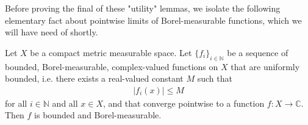 Before proving the final of these "utility" lemmas, we isolate the following elementary fact about pointwise limits of Borel-measurable functions, which we will have need of shortly.

\begin{lemma}
    \label{lmm:pointwise-limits-of-borel-measurable-functions}
    \leanok
    Let $X$ be a compact metric measurable space. Let $\{ f_i \}_{i \in \mathbb{N}}$ be a sequence of bounded, Borel-measurable, complex-valued functions on $X$ that are uniformly bounded, i.e. there exists a real-valued constant $M$ such that
    \begin{align}
        \lvert f_i(x) \rvert \le M
    \end{align}
    for all $i \in \mathbb{N}$ and all $x \in X$, and that converge pointwise to a function $f : X \rightarrow \mathbb{C}$. Then $f$ is bounded and Borel-measurable.
\end{lemma}

